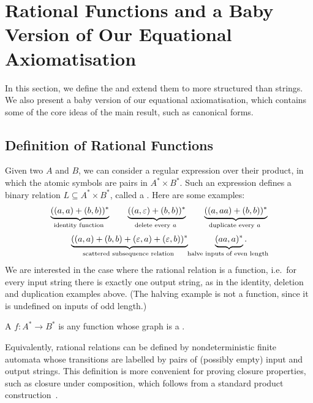 \section{Rational Functions and a Baby Version of Our Equational Axiomatisation}
\label{sec:rational-functions}
In this section, we define the  and extend them to more structured  than strings. We also present a baby version of our equational axiomatisation, which contains some of the core ideas of the main result, such as canonical forms.


\subsection{Definition of Rational Functions}
\label{sec:definition-of-rational-functions}
Given two  $A$ and $B$, we can consider a regular expression over their product, in which the atomic symbols are pairs in $A^* \times B^*$. Such an expression defines a binary relation $L \subseteq A^* \times B^*$, called a . Here are some examples: 
\begin{gather*}
\myunderbrace{((a,a)+(b,b))^*}{identity function}
\qquad
\myunderbrace{((a,\varepsilon)+(b,b))^*}{delete every $a$}
\qquad
\myunderbrace{((a,aa)+(b,b))^*}{duplicate every $a$}
\\[2pt]
\myunderbrace{((a,a)+(b,b)+(\varepsilon,a)+(\varepsilon,b))^*}{scattered subsequence relation}
\qquad \quad
\myunderbrace{(aa,a)^*}{halve inputs of even length}.
\end{gather*}
We are interested in the case where the rational relation is a function, i.e.~for every input string there is exactly one output string, as in the identity, deletion and duplication examples above. (The halving example is not a function, since it is undefined on inputs of odd length.)

\begin{definition}
    \label{def:rational-function}
     A  $f : A^* \to B^*$ is any function whose graph is a .
\end{definition}

Equivalently, rational relations can be defined by nondeterministic finite automata whose transitions are labelled by pairs of (possibly empty) input and output strings. This definition is more convenient for proving closure properties, such as closure under composition, which follows from a standard product construction~\cite[Theorem 4.1]{Eilenberg1974}.
